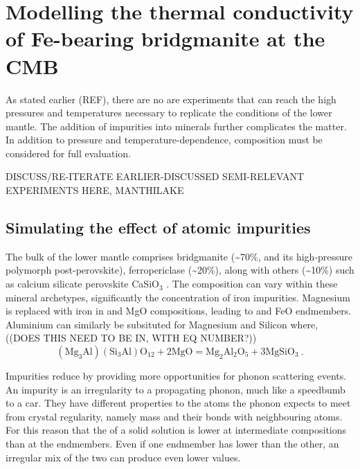 \chapter{Modelling the thermal conductivity of Fe-bearing bridgmanite at the CMB} %

\label{Chapter4} %

As stated earlier (REF), there are no are experiments that can reach the high pressures and temperatures necessary to replicate the conditions of the lower mantle. The addition of impurities into minerals further complicates the matter. In addition to pressure and temperature-dependence, composition must be considered for full evaluation.

DISCUSS/RE-ITERATE EARLIER-DISCUSSED SEMI-RELEVANT EXPERIMENTS HERE, MANTHILAKE

\section{Simulating the effect of atomic impurities}

The bulk of the lower mantle comprises bridgmanite (\textasciitilde70\%, and its high-pressure polymorph post-perovskite), ferropericlase (\textasciitilde20\%), along with others (\textasciitilde10\%) such as calcium silicate perovskite CaSiO$_3$ \citep{Tronnes2009}. The composition can vary within these mineral archetypes, significantly the concentration of iron impurities. Magnesium is replaced with iron in 
\mgsios and MgO compositions, leading to \fesios and FeO endmembers. Aluminium can similarly be subsituted for Magnesium and Silicon
\citep[as in][]{Brodholt2000} where, ((DOES THIS NEED TO BE IN, WITH EQ NUMBER?))
%
\begin{equation}
\mathrm{ \left ( Mg_{3}Al \right )\left ( Si_{3}Al \right )O_{12} + 2MgO = Mg_{2}Al_{2}O_{5} + 3MgSiO_{3} }\ .
\label{eq.brodholt_al}
\end{equation}
%

Impurities reduce \tcs by providing more opportunities for phonon scattering events. An impurity is an irregularity to a propagating phonon, much like a speedbumb to a car. They have different properties to the atoms the phonon expects to meet from crystal regularity, namely mass and their bonds with neighbouring atoms. For this reason that the \tcs of a solid solution is lower at intermediate compositions than at the endmembers. Even if one endmember has lower \cs than the other, an irregular mix of the two can produce even lower values.



